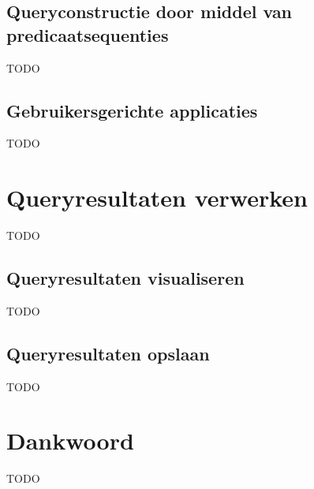 \documentclass[conference]{IEEEtran}
\begin{document}
\subsection{Queryconstructie door middel van predicaatsequenties}
TODO

\subsection{Gebruikersgerichte applicaties}
TODO

\section{Queryresultaten verwerken}
TODO

\subsection{Queryresultaten visualiseren}
TODO

\subsection{Queryresultaten opslaan}
TODO

\section*{Dankwoord}
TODO

% 
% 
\end{document}
